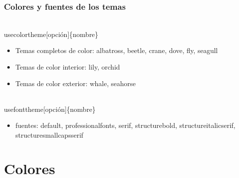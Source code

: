\documentclass[11pt]{beamer}
\begin{document}
\begin{frame}\frametitle{Colores y fuentes de los temas}

\begin{block}{} \scriptsize
\begin{semiverbatim}\\usecolortheme[opci\'on]\{nombre\}
\end{semiverbatim}
\end{block}

\begin{itemize}
\item Temas completos de color: albatross, beetle, crane, dove, fly,
seagull

\item Temas de color interior: lily, orchid

\item Temas de color exterior: whale, seahorse

\end{itemize}



\begin{block}{} \scriptsize
\begin{semiverbatim}\\usefonttheme[opci\'on]\{nombre\}
\end{semiverbatim}
\end{block}

\begin{itemize}
\item fuentes: default, professionalfonts, serif, structurebold,
structureitalicserif, structuresmallcapsserif
\end{itemize}
\end{frame}



\section{Colores}
\end{document}
